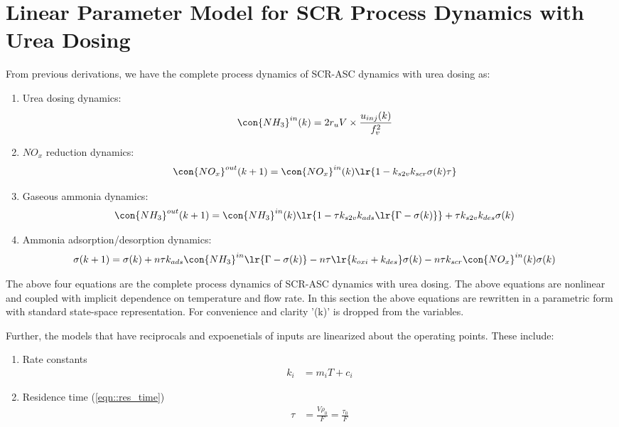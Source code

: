 \newpage
\section{Linear Parameter Model for SCR Process Dynamics with Urea Dosing \label{sec::proc_dyn}}
From previous derivations, we have the complete process dynamics of SCR-ASC dynamics with urea dosing as:

\begin{enumerate}
    \item Urea dosing dynamics:
    \begin{align*}
    \con{NH_3}^{in} (k) &= 2r_u V \times \frac{u_{inj}(k)}{f_v^2}
    \end{align*}

    \item $NO_x$ reduction dynamics:
    \begin{align*}
    \con{NO_x}^{out} (k + 1) &= \con{NO_x}^{in} (k) \lr{1 - k_{s2v} k_{scr} \sigma(k) \tau}
    \end{align*}

    \item Gaseous ammonia dynamics:
    \begin{align*}
    \con{NH_3}^{out} (k + 1) &= \con{NH_3}^{in}(k) \lr{1 - \tau k_{s2v}k_{ads} \lr{\Gamma - \sigma(k)}} + \tau k_{s2v} k_{des} \sigma(k)
    \end{align*}

    \item Ammonia adsorption/desorption dynamics:
 \begin{align*}
        \sigma(k + 1) &= \sigma(k)
        + n\tau k_{ads} \con{NH_3}^{in} \lr{\Gamma - \sigma(k)}
        - n \tau \lr{k_{oxi} + k_{des}} \sigma(k)
        - n \tau k_{scr} \con{NO_x}^{in}(k) \sigma(k)
    \end{align*}
\end{enumerate}

The above four equations are the complete process dynamics of SCR-ASC dynamics with urea dosing. The above equations are
nonlinear and coupled with implicit dependence on temperature and flow rate. In this section the above equations are
rewritten in a parametric form with standard state-space representation. For convenience and clarity '(k)' is dropped
from the variables.


Further, the models that have reciprocals and expoenetials of inputs are linearized about the operating points. These include:
\begin{enumerate}
    \item Rate constants
        \begin{align}
            k_i &= m_i T + c_i
        \end{align}
    \item Residence time (\ref{eqn::res_time})
        \begin{align}
            \tau &= \frac{V \rho_0}{F} = \frac{\tau_0}{F}
        \end{align}
\end{enumerate}

